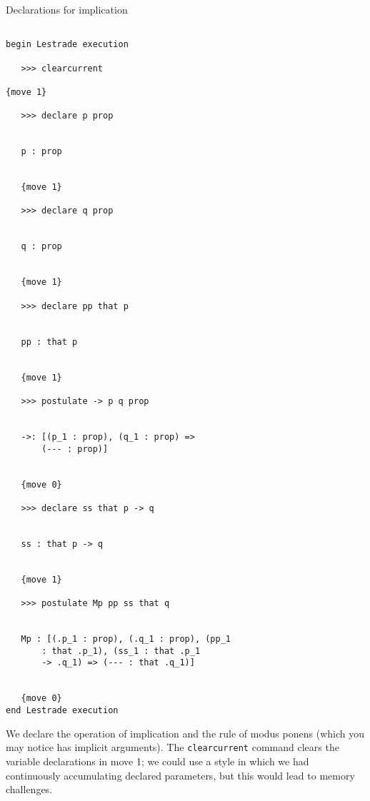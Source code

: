 \documentclass{slides}
\begin{document}
\begin{slide}

{\Large Declarations for implication}
{\tiny
\begin{verbatim}

begin Lestrade execution

   >>> clearcurrent

{move 1}

   >>> declare p prop


   p : prop


   {move 1}

   >>> declare q prop


   q : prop


   {move 1}

   >>> declare pp that p


   pp : that p


   {move 1}

   >>> postulate -> p q prop


   ->: [(p_1 : prop), (q_1 : prop) => 
       (--- : prop)]


   {move 0}

   >>> declare ss that p -> q


   ss : that p -> q


   {move 1}

   >>> postulate Mp pp ss that q


   Mp : [(.p_1 : prop), (.q_1 : prop), (pp_1 
       : that .p_1), (ss_1 : that .p_1 
       -> .q_1) => (--- : that .q_1)]


   {move 0}
end Lestrade execution

\end{verbatim}
}

We declare the operation of implication and the rule of modus ponens (which you may notice
has implicit arguments).  The {\tt clearcurrent} command clears the variable declarations in move 1;
we could use a style in which we had continuously accumulating declared parameters, but this would lead to memory challenges.


\end{slide}
\end{document}
